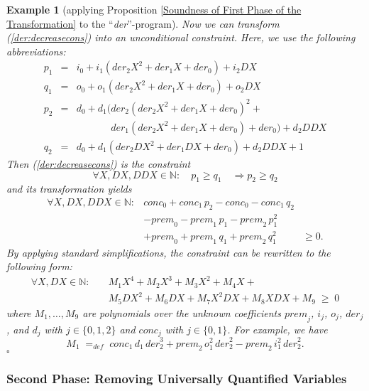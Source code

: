 \documentclass[envcountsame]{tlp}
\newcounter{ex:der-lastsymconsctr}
\newtheorem{example}{Example}
\begin{document}
\begin{example}[applying Proposition \ref{Soundness of First Phase of the
Transformation} to the  ``\textit{der}''-program]
Now we can transform (\ref{der:decreasecons})  into an unconditional
constraint. Here, we use the following abbreviations:
\[ \begin{array}{lll}
p_1 &=&
i_0+i_1(\mathit{der}_2X^2+\mathit{der}_1X+\mathit{der}_0)+i_2\mathit{DX} \\
q_1 &=&  o_0+o_1(\mathit{der}_2X^2+\mathit{der}_1X+\mathit{der}_0)+
o_2\mathit{DX}  \\
p_2 &=& 
 d_0 +
d_1(\mathit{der}_2(\mathit{der}_2X^2+\mathit{der}_1X+\mathit{der}_0)^2+ \nonumber \\ 
&& \phantom{d_0 +
d_1(}
\mathit{der}_1(\mathit{der}_2X^2+\mathit{der}_1X+\mathit{der}_0)+\mathit{der}_0)
+d_2 \mathit{DDX} \\
q_2 &=&  d_0 +
d_1(\mathit{der}_2\mathit{DX}^2+\mathit{der}_1\mathit{DX}+\mathit{der}_0)+
d_2 \mathit{DDX} +1
\end{array}\]
Then  (\ref{der:decreasecons}) is the constraint
\[   \forall X, \mathit{DX}, \mathit{DDX} \in
\mathbb{N}:       \quad
p_1 \ge q_1 \quad \Rightarrow p_2 \ge q_2\]
and its transformation yields
\[ \begin{array}{lll}
  \forall X, \mathit{DX}, \mathit{DDX} \in \mathbb{N}:   & \mathit{conc}_0 +
\mathit{conc}_1 \, p_2 -  \mathit{conc}_0 - \mathit{conc}_1 \, q_2&\\
& -  \mathit{prem}_0 - \mathit{prem}_1 \, p_1 - \mathit{prem}_2 \, p_1^2&\\
&+ \mathit{prem}_0 + \mathit{prem}_1 \, q_1+\mathit{prem}_2 \, q_1^2 &\geq 0. \end{array}\]
By applying standard simplifications, the constraint can be rewritten to  
the following form:
\setcounter{ex:der-lastsymconsctr}{\value{equation}}
\begin{align}
       \forall X, \mathit{DX} \in \mathbb{N}: \quad &M_1X^4+M_2X^3+M_3X^2+M_4X + \nonumber\\
&  
M_5\mathit{DX}^2+M_6\mathit{DX}+
M_7 X^2 \mathit{DX} +
M_8 X \mathit{DX} +
M_9 \; \ge \;0 
 \label{ex:der-lastsymcons} 
\end{align}
where $M_1,\ldots,M_9$ are 
polynomials over the unknown coefficients
$\mathit{prem}_j$, $i_j$, $o_j$, $\mathit{der}_j$, and
$d_j$ with $j \in \{0,1,2\}$ and $\mathit{conc}_j$ with $j \in \{0,1\}$.
For example, we have
\[
M_1 \; =_{\mathit{def}} \; \mathit{conc}_1 \, d_1 \, \mathit{der}_2^3 + \mathit{prem}_2 \, o_1^2
\, \mathit{der}_2^2 -
\mathit{prem}_2 \, i_1^2 \, \mathit{der}_2^2.\]
\hfill{$\square$}
\end{example}
\subsubsection{Second Phase: Removing Universally Quantified Variables}\label{poly-inter-generating}\hspace*{\fill}
\end{document}
